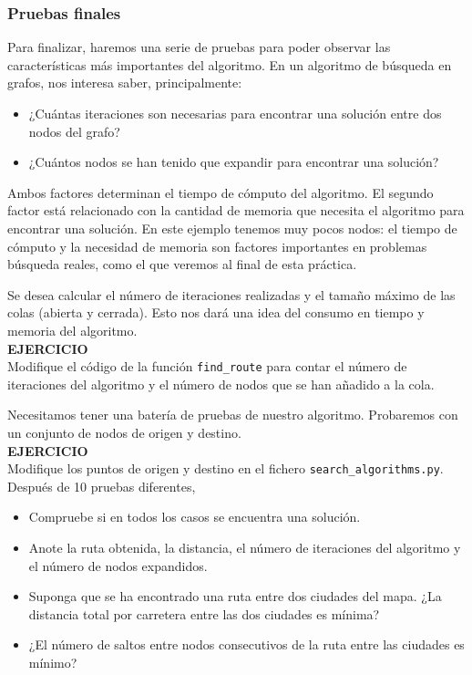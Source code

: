 \documentclass{article}
\begin{document}
\subsubsection{Pruebas finales}
Para finalizar, haremos una serie de pruebas para poder observar las características más importantes del algoritmo. En un algoritmo de búsqueda en grafos, nos interesa saber, principalmente:
\begin{itemize}
    \item ¿Cuántas iteraciones son necesarias para encontrar una solución entre dos nodos del grafo?
    \item ¿Cuántos nodos se han tenido que expandir para encontrar una solución?
\end{itemize}

Ambos factores determinan el tiempo de cómputo del algoritmo. El segundo factor está relacionado con la cantidad de memoria que necesita el algoritmo para encontrar una solución. En este ejemplo tenemos muy pocos nodos: el tiempo de cómputo y la necesidad de memoria son factores importantes en problemas búsqueda reales, como el que veremos al final de esta práctica.

\begin{exercise}
Se desea calcular el número de iteraciones realizadas y el tamaño máximo de las colas (abierta y cerrada). Esto nos dará una idea del consumo en tiempo y memoria del algoritmo.\\

\textbf{EJERCICIO}\\ 
Modifique el código de la función \texttt{find\_route} para contar el número de iteraciones del algoritmo y el número de nodos que se han añadido a la cola.
\end{exercise}

\begin{exercise}
Necesitamos tener una batería de pruebas de nuestro algoritmo. Probaremos con un conjunto de nodos de origen y destino.\\

\textbf{EJERCICIO}\\
Modifique los puntos de origen y destino en el fichero \texttt{search\_algorithms.py}. Después de 10 pruebas diferentes, 
\begin{itemize}
    \item Compruebe si en todos los casos se encuentra una solución.
    \item Anote la ruta obtenida, la distancia, el número de iteraciones del algoritmo y el número de nodos expandidos.
    \item Suponga que se ha encontrado una ruta entre dos ciudades del mapa. ¿La distancia total por carretera entre las dos ciudades es mínima? 
    \item ¿El número de saltos entre nodos consecutivos de la ruta entre las ciudades es mínimo?
\end{itemize}      
\end{exercise}
\end{document}
